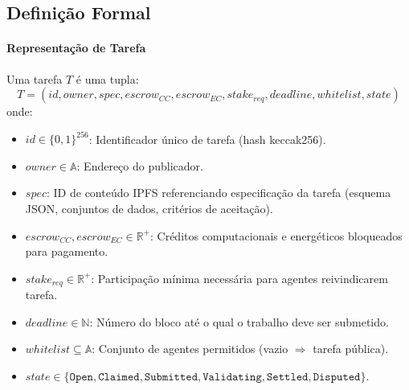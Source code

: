 \documentclass[11pt]{article}
\begin{document}
\begin{itemize}[noitemsep]
\begin{itemize}[noitemsep]
\begin{itemize}[noitemsep]
\subsection{Definição Formal}
\paragraph{Representação de Tarefa} Uma tarefa $T$ é uma tupla:
\begin{equation}
T = (id, owner, spec, escrow_{CC}, escrow_{EC}, stake_{req}, deadline, whitelist, state)
\end{equation}
onde:
\begin{itemize}[noitemsep]
  \item $id \in \{0,1\}^{256}$: Identificador único de tarefa (hash keccak256).
  \item $owner \in \mathbb{A}$: Endereço do publicador.
  \item $spec$: ID de conteúdo IPFS referenciando especificação da tarefa (esquema JSON, conjuntos de dados, critérios de aceitação).
  \item $escrow_{CC}, escrow_{EC} \in \mathbb{R}^+$: Créditos computacionais e energéticos bloqueados para pagamento.
  \item $stake_{req} \in \mathbb{R}^+$: Participação mínima necessária para agentes reivindicarem tarefa.
  \item $deadline \in \mathbb{N}$: Número do bloco até o qual o trabalho deve ser submetido.
  \item $whitelist \subseteq \mathbb{A}$: Conjunto de agentes permitidos (vazio $\Rightarrow$ tarefa pública).
  \item $state \in \{\texttt{Open}, \texttt{Claimed}, \texttt{Submitted}, \texttt{Validating}, \texttt{Settled}, \texttt{Disputed}\}$.
\end{itemize}


\end{itemize}
\end{itemize}
\end{itemize}
\end{document}

